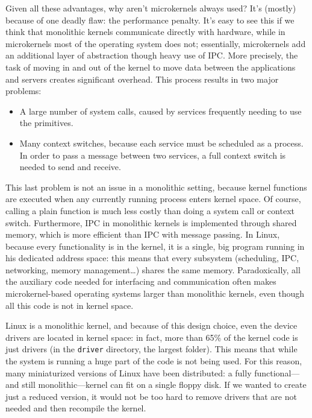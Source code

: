 \documentclass[10pt, oneside]{book}
\begin{document}
Given all these advantages, why aren't microkernels always used? It's (mostly) because of one deadly flaw: the performance penalty. It's easy to see this if we think that monolithic kernels communicate directly with hardware, while in microkernels most of the operating system does not; essentially, microkernels add an additional layer of abstraction though heavy use of IPC. More precisely, the task of moving in and out of the kernel to move data between the applications and servers creates significant overhead. This process results in two major problems:
\begin{itemize}
\item A large number of system calls, caused by services frequently needing to use the primitives.
\item Many context switches, because each service must be scheduled as a process. In order to pass a message between two services, a full context switch is needed to send and receive.
\end{itemize}
This last problem is not an issue in a monolithic setting, because kernel functions are executed when any currently running process enters kernel space. Of course, calling a plain function is much less costly than doing a system call or context switch. Furthermore, IPC in monolithic kernels is implemented through shared memory, which is more efficient than IPC with message passing. In Linux, because every functionality is in the kernel, it is a single, big program running in his dedicated address space: this means that every subsystem (scheduling, IPC, networking, memory management\dots) shares the same memory. Paradoxically, all the auxiliary code needed for interfacing and communication often makes microkernel-based operating systems larger than monolithic kernels, even though all this code is not in kernel space. 

Linux is a monolithic kernel, and because of this design choice, even the device drivers are located in kernel space: in fact, more than 65\% of the kernel code is just drivers (in the \verb|driver| directory, the largest folder). This means that while the system is running a huge part of the code is not being used. For this reason, many miniaturized versions of Linux have been distributed: a fully functional---and still monolithic---kernel can fit on a single floppy disk. If we wanted to create just a reduced version, it would not be too hard to remove drivers that are not needed and then recompile the kernel. 
\end{document}

